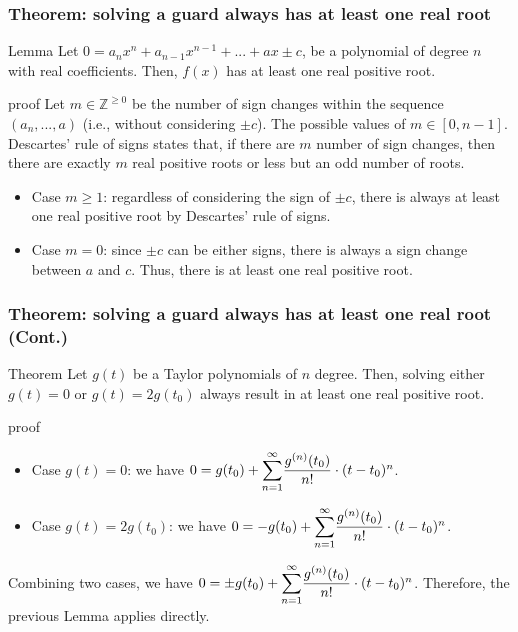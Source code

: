 \begin{frame}[c] \frametitle{ Theorem: solving a guard always has at least one real root }
	\begin{block}{Lemma}
		Let $0 = a_n x^n + a_{n-1} x^{n-1} + ... + ax \pm c$, be a polynomial of degree $n$ with real coefficients. Then, $f(x)$ has at least one real positive root.
	\end{block}
	\begin{block}{proof}
		Let $m \in \mathbb{Z}^{\geq 0}$ be the number of sign changes within the sequence $(a_n,...,a)$ (i.e., without considering $\pm c$). The possible values of $m \in [0,n-1]$. Descartes' rule of signs states that, if there are $m$ number of sign changes, then there are exactly $m$ real positive roots or less but an odd number of roots. 
		\begin{itemize}
			\item Case $m \geq 1$: regardless of considering the sign of $\pm c$, there is always at least one real positive root by Descartes' rule of signs. 
			\item Case $m = 0$: since $\pm c$ can be either signs, there is always a sign change between $a$ and $c$. Thus, there is at least one real positive root.
		\end{itemize}
	\end{block}
\end{frame}

\begin{frame}[c] \frametitle{ Theorem: solving a guard always has at least one real root (Cont.) }
	\begin{block}{Theorem}
		Let $g(t)$ be a Taylor polynomials of $n$ degree. Then, solving either $g(t) = 0$ or $g(t) = 2g(t_0)$ always result in at least one real positive root.
	\end{block}
	\begin{block}{proof}
		\begin{itemize}
			\item Case $g(t) = 0$: we have $0 = g(t_0) + \mathlarger{\sum}_{n=1}^{\infty} \dfrac{g^{(n)}(t_0)}{n!} \cdot (t - t_0)^n$. 
			\item Case $g(t) = 2g(t_0)$: we have $0 = -g(t_0) + \mathlarger{\sum}_{n=1}^{\infty} \dfrac{g^{(n)}(t_0)}{n!} \cdot (t - t_0)^n$.
		\end{itemize}
		Combining two cases, we have $0 = \pm g(t_0) + \mathlarger{\sum}_{n=1}^{\infty} \dfrac{g^{(n)}(t_0)}{n!} \cdot (t - t_0)^n$. Therefore, the previous Lemma applies directly.
	\end{block}
\end{frame}

